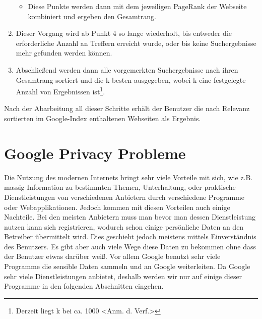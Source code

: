 \documentclass[12pt, a4paper]{llncs}
\begin{document}
\begin{enumerate}
\begin{itemize}
		\item Diese Punkte werden dann mit dem jeweiligen PageRank der Webseite kombiniert und ergeben den Gesamtrang.
	\end{itemize}
	\item Dieser Vorgang wird ab Punkt 4 so lange wiederholt, bis entweder die erforderliche Anzahl an Treffern erreicht wurde, oder bis keine Suchergebnisse mehr gefunden
		werden können.
	\item Abschließend werden dann alle vorgemerkten Suchergebnisse nach ihren Gesamtrang sortiert und die k besten ausgegeben, wobei k eine festgelegte Anzahl von Ergebnissen
		ist\footnote{Derzeit liegt k bei ca. 1000 \textless Anm. d. Verf.\textgreater}.
	\end{enumerate}
	Nach der Abarbeitung all dieser Schritte erhält der Benutzer die nach Relevanz sortierten im Google-Index enthaltenen Webseiten als Ergebnis.
	
	\section{Google Privacy Probleme}

	Die Nutzung des modernen Internets bringt sehr viele Vorteile mit sich, wie z.B. massig Information zu bestimmten Themen, Unterhaltung, oder praktische Dienstleistungen von verschiedenen Anbietern durch verschiedene Programme oder Webapplikationen. Jedoch kommen mit diesen Vorteilen auch einige Nachteile. Bei den meisten Anbietern muss man bevor man dessen Dienstleistung nutzen kann sich registrieren, wodurch schon einige persönliche Daten an den Betreiber übermittelt wird. Dies geschieht jedoch meistens mittels Einverständnis des Benutzers. Es gibt aber auch viele Wege diese Daten zu bekommen ohne dass der Benutzer etwas darüber weiß. Vor allem Google benutzt sehr viele Programme die sensible Daten sammeln und an Google weiterleiten. Da Google sehr viele Dienstleistungen anbietet, deshalb werden wir nur auf einige dieser Programme in den folgenden Abschnitten eingehen.
	\\
\end{document}
